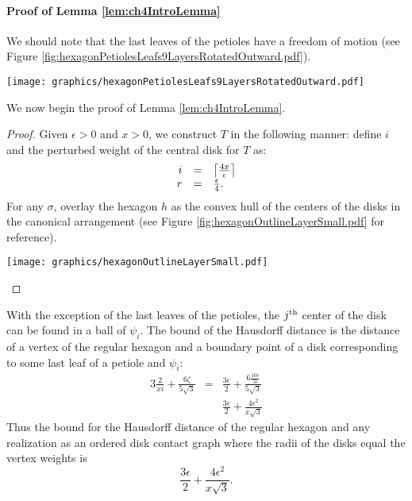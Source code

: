 \paragraph{Proof of Lemma \ref{lem:ch4IntroLemma}}

We should note that the last leaves of the petioles have a freedom of motion (see Figure \ref{fig:hexagonPetiolesLeafs9LayersRotatedOutward.pdf}).  

\begin{minipage}{\linewidth}
\begin{center}
\texttt{[image: graphics/hexagonPetiolesLeafs9LayersRotatedOutward.pdf]}
\label{fig:hexagonPetiolesLeafs9LayersRotatedOutward.pdf}
\end{center}
\end{minipage}

We now begin the proof of Lemma \ref{lem:ch4IntroLemma}.

\begin{proof}
Given $\epsilon > 0$ and $x>0$,  we construct $T$ in the following manner: define $i$ and the perturbed weight of the central disk for $T$ as:
$$
\begin{array}{rcl}
i &=& \left\lceil \frac{4x}{\epsilon} \right\rceil\\
r &=& \frac{\epsilon}{4}.
\end{array}
$$
For any $\sigma$, overlay the hexagon $h$ as the convex hull of the centers of the disks in the canonical arrangement (see Figure \ref{fig:hexagonOutlineLayerSmall.pdf} for reference).  

\begin{minipage}{\linewidth}
\begin{center}
\texttt{[image: graphics/hexagonOutlineLayerSmall.pdf]}
\label{fig:hexagonOutlineLayerSmall.pdf}
\end{center}
\end{minipage}
\end{proof}

With the exception of the last leaves of the petioles, the $j^\text{th}$ center of the disk can be found in a ball of $\psi_i$.  
The bound of the Hausdorff distance is the distance of a vertex of the regular hexagon and a boundary point of a disk corresponding to some last leaf of a petiole and $\psi_i$:
$$\begin{array}{rcl}
3 \frac{2}{xi} + \frac{6 \zeta}{5 \sqrt{3}}&=& \frac{3 \epsilon}{2}+ \frac{6 \frac{10\epsilon}{3i}}{5 \sqrt{3}}\\
&&\frac{3 \epsilon}{2}+\frac{4 \epsilon^2 }{x \sqrt{3}}
\end{array}
$$
Thus the bound for the Hausdorff distance of the regular hexagon and any realization as an ordered disk contact graph where the radii of the disks equal the vertex weights is $$\frac{3 \epsilon}{2}+\frac{4 \epsilon^2 }{x \sqrt{3}}.$$

